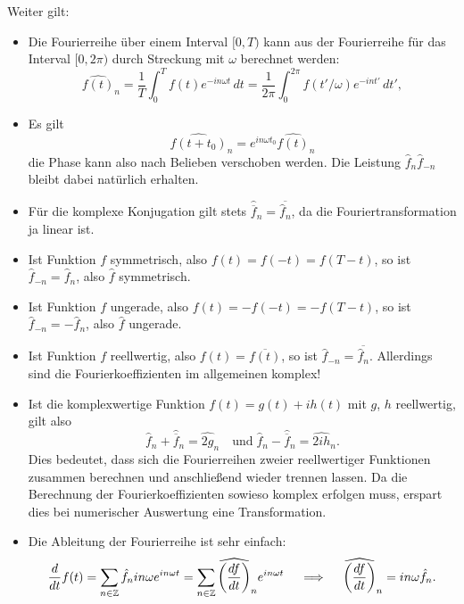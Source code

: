 Weiter gilt:
\begin{itemize}
\item Die Fourierreihe über einem Interval $[0,T)$ kann aus der
  Fourierreihe für das Interval $[0,2\pi)$ durch Streckung mit
  $\omega$ berechnet werden:
  \begin{equation}
    \widehat{f(t)}_n = \frac{1}{T}\int_0^T f(t)e^{-i n\omega t}\, dt
    = \frac{1}{2\pi}\int_0^{2\pi} f(t'/\omega)e^{-i n t'}\, dt',
  \end{equation}
\item Es gilt
  \begin{equation}
    \widehat{f(t + t_0)}_{n} = e^{i n \omega t_0} \widehat{f(t)}_{n}
  \end{equation}
  die Phase kann also nach Belieben verschoben werden. Die Leistung
  $\hat{f}_{n}\hat{f}_{-n}$ bleibt dabei natürlich erhalten.
\item Für die komplexe Konjugation gilt stets
  $\widehat{\overline{f}}_n = \overline{\hat{f}_n}$, da die
  Fouriertransformation ja linear ist.
\item Ist Funktion $f$ symmetrisch, also $f(t) = f(-t) = f(T-t)$, so ist
  $\hat{f}_{-n} = \hat{f}_n$, also $\hat{f}$ symmetrisch.
\item Ist Funktion $f$ ungerade, also $f(t) = -f(-t) = -f(T-t)$, so ist
  $\hat{f}_{-n} = -\hat{f}_n$, also $\hat{f}$ ungerade.
\item Ist Funktion $f$ reellwertig, also $f(t) = \overline{f(t)}$, so
  ist $\hat{f}_{-n} = \overline{\hat{f}_n}$. Allerdings sind die
  Fourierkoeffizienten im allgemeinen komplex!
\item 
  Ist die komplexwertige Funktion $f(t)=g(t) + ih(t)$ mit $g$, $h$
  reellwertig, gilt also
  \begin{equation}
    \hat{f}_{n}  + \hat{\overline{f}}_{n} = \widehat{2g}_{n}
    \quad\text{und}\;
    \hat{f}_{n}  - \hat{\overline{f}}_{n} = \widehat{2ih}_{n}.
  \end{equation}
  Dies bedeutet, dass sich die Fourierreihen zweier reellwertiger
  Funktionen zusammen berechnen und anschließend wieder trennen
  lassen. Da die Berechnung der Fourierkoeffizienten sowieso komplex
  erfolgen muss, erspart dies bei numerischer Auswertung eine
  Transformation.
\item Die Ableitung der Fourierreihe ist sehr einfach:
  \begin{equation}
    \frac{d}{dt}  f(t) = \sum_{n\in\mathbb{Z}} \hat{f}_n i n\omega e^{i n\omega
      t} = \sum_{n\in\mathbb{Z}} \widehat{\left(\frac{df}{dt}\right)}_n e^{i n\omega
      t}\quad\implies\quad \widehat{\left(\frac{df}{dt}\right)}_n= i n\omega\hat{f}_n.
  \end{equation}
\end{itemize}

